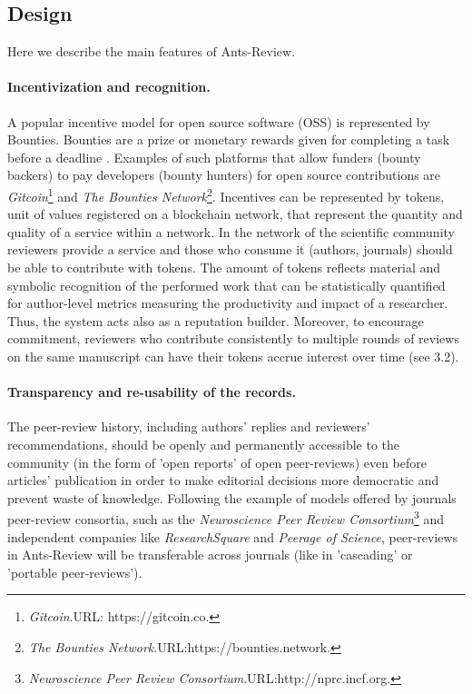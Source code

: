 \documentclass[runningheads]{llncs}
\begin{document}
\subsection{Design}

Here we describe the main features of Ants-Review.
\paragraph{Incentivization and recognition.} A popular incentive model for open source software (OSS) is represented by Bounties. Bounties are a prize or monetary rewards given for completing a task before a deadline \cite{BountyGit}. Examples of such platforms that allow funders (bounty backers) to pay developers (bounty hunters) for open source contributions are \emph{Gitcoin}\footnote[4]{\emph{Gitcoin}.\textsc{URL:} https://gitcoin.co.} and \emph{The Bounties Network}\footnote[5]{\emph{The Bounties Network}.\textsc{URL:}https://bounties.network.}. Incentives can be represented by tokens, unit of values registered on a blockchain network, that represent the quantity and quality of a service within a network.
\newline In the network of the scientific community reviewers provide a service and those who consume it (authors, journals) should be able to contribute with tokens. The amount of tokens reflects material and symbolic recognition of the performed work that can be statistically quantified for author-level metrics measuring the productivity and impact of a researcher.
Thus, the system acts also as a reputation builder.
\newline Moreover, to encourage commitment, reviewers who contribute consistently to multiple rounds of reviews on the same manuscript can have their tokens accrue interest over time (see 3.2).

\paragraph{Transparency and re-usability of the records.} The peer-review history, including authors' replies and reviewers' recommendations, should be openly and permanently accessible to the community (in the form of 'open reports' of open peer-reviews) even before articles' publication in order to  make editorial decisions more democratic and prevent waste of knowledge. Following the example of models offered by journals peer-review consortia, such as the \emph{Neuroscience Peer Review Consortium}\footnote[6]{\emph{Neuroscience Peer Review Consortium}.\textsc{URL:}http://nprc.incf.org.} and independent companies like \emph{ResearchSquare}  and \emph{Peerage of Science}, peer-reviews in Ants-Review will be transferable across journals (like in 'cascading' or 'portable peer-reviews').
\end{document}
